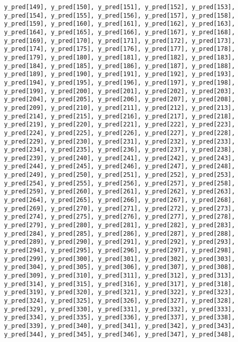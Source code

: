 \documentclass[
  letterpaper,
  DIV=11,
  numbers=noendperiod]{scrartcl}
\begin{document}
\begin{verbatim}
y_pred[149], y_pred[150], y_pred[151], y_pred[152], y_pred[153],
y_pred[154], y_pred[155], y_pred[156], y_pred[157], y_pred[158],
y_pred[159], y_pred[160], y_pred[161], y_pred[162], y_pred[163],
y_pred[164], y_pred[165], y_pred[166], y_pred[167], y_pred[168],
y_pred[169], y_pred[170], y_pred[171], y_pred[172], y_pred[173],
y_pred[174], y_pred[175], y_pred[176], y_pred[177], y_pred[178],
y_pred[179], y_pred[180], y_pred[181], y_pred[182], y_pred[183],
y_pred[184], y_pred[185], y_pred[186], y_pred[187], y_pred[188],
y_pred[189], y_pred[190], y_pred[191], y_pred[192], y_pred[193],
y_pred[194], y_pred[195], y_pred[196], y_pred[197], y_pred[198],
y_pred[199], y_pred[200], y_pred[201], y_pred[202], y_pred[203],
y_pred[204], y_pred[205], y_pred[206], y_pred[207], y_pred[208],
y_pred[209], y_pred[210], y_pred[211], y_pred[212], y_pred[213],
y_pred[214], y_pred[215], y_pred[216], y_pred[217], y_pred[218],
y_pred[219], y_pred[220], y_pred[221], y_pred[222], y_pred[223],
y_pred[224], y_pred[225], y_pred[226], y_pred[227], y_pred[228],
y_pred[229], y_pred[230], y_pred[231], y_pred[232], y_pred[233],
y_pred[234], y_pred[235], y_pred[236], y_pred[237], y_pred[238],
y_pred[239], y_pred[240], y_pred[241], y_pred[242], y_pred[243],
y_pred[244], y_pred[245], y_pred[246], y_pred[247], y_pred[248],
y_pred[249], y_pred[250], y_pred[251], y_pred[252], y_pred[253],
y_pred[254], y_pred[255], y_pred[256], y_pred[257], y_pred[258],
y_pred[259], y_pred[260], y_pred[261], y_pred[262], y_pred[263],
y_pred[264], y_pred[265], y_pred[266], y_pred[267], y_pred[268],
y_pred[269], y_pred[270], y_pred[271], y_pred[272], y_pred[273],
y_pred[274], y_pred[275], y_pred[276], y_pred[277], y_pred[278],
y_pred[279], y_pred[280], y_pred[281], y_pred[282], y_pred[283],
y_pred[284], y_pred[285], y_pred[286], y_pred[287], y_pred[288],
y_pred[289], y_pred[290], y_pred[291], y_pred[292], y_pred[293],
y_pred[294], y_pred[295], y_pred[296], y_pred[297], y_pred[298],
y_pred[299], y_pred[300], y_pred[301], y_pred[302], y_pred[303],
y_pred[304], y_pred[305], y_pred[306], y_pred[307], y_pred[308],
y_pred[309], y_pred[310], y_pred[311], y_pred[312], y_pred[313],
y_pred[314], y_pred[315], y_pred[316], y_pred[317], y_pred[318],
y_pred[319], y_pred[320], y_pred[321], y_pred[322], y_pred[323],
y_pred[324], y_pred[325], y_pred[326], y_pred[327], y_pred[328],
y_pred[329], y_pred[330], y_pred[331], y_pred[332], y_pred[333],
y_pred[334], y_pred[335], y_pred[336], y_pred[337], y_pred[338],
y_pred[339], y_pred[340], y_pred[341], y_pred[342], y_pred[343],
y_pred[344], y_pred[345], y_pred[346], y_pred[347], y_pred[348],

\end{verbatim}
\end{document}
